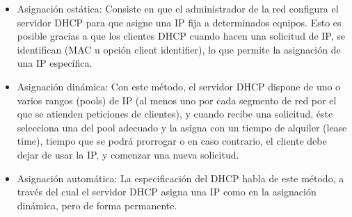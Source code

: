 		\begin{itemize}
			\item Asignación estática: Consiste en que el administrador de la red configura el servidor DHCP para que asigne una IP fija a determinados equipos. Esto es posible gracias a que los clientes DHCP cuando hacen una solicitud de IP, se identifican (MAC u opción client identifier), lo que permite la asignación de una IP específica.
			\item Asignación dinámica: Con este método, el servidor DHCP dispone de uno o varios rangos (pools) de IP (al menos uno por cada segmento de red por el que se atienden peticiones de clientes), y cuando recibe una solicitud, éste selecciona una del pool adecuado y la asigna con un tiempo de alquiler (lease time), tiempo que se podrá prorrogar o en caso contrario, el cliente debe dejar de usar la IP, y comenzar una nueva solicitud.
			\item Asignación automática: La especificación del DHCP habla de este método, a través del cual el servidor DHCP asigna una IP como en la asignación dinámica, pero de forma permanente.
		\end{itemize}
		
